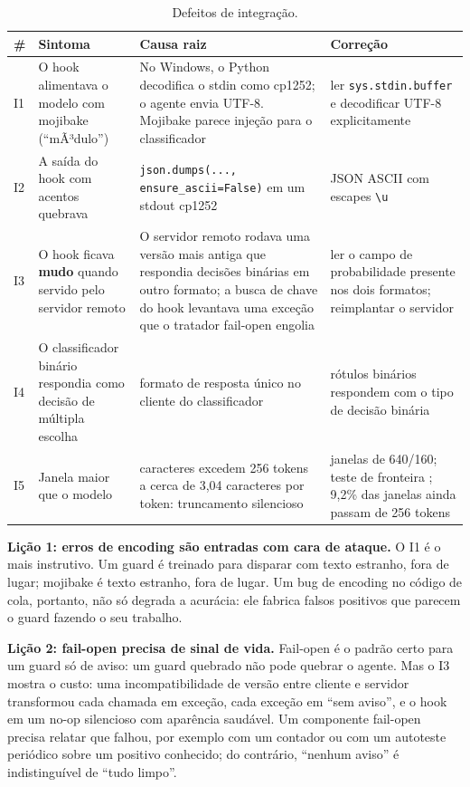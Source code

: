 \documentclass[11pt]{article}
\newcommand{\code}[1]{\texttt{#1}}
\begin{document}
\begin{table}[tbp]
\centering
\small
\caption{Defeitos de integração.}\label{tab:12}
\begin{tabularx}{\linewidth}{@{}l>{\raggedright\arraybackslash\hsize=0.60\hsize}X>{\raggedright\arraybackslash\hsize=1.50\hsize}X>{\raggedright\arraybackslash\hsize=0.90\hsize}X@{}}
\toprule
\# & Sintoma & Causa raiz & Correção \\
\midrule
I1 & O hook alimentava o modelo com mojibake (``mÃ³dulo'') & No Windows, o Python decodifica o stdin como cp1252; o agente envia UTF-8. Mojibake parece injeção para o classificador & ler \code{sys.\allowbreak{}stdin.\allowbreak{}buffer} e decodificar UTF-8 explicitamente %
 \\
I2 & A saída do hook com acentos quebrava & \code{json.\allowbreak{}dumps(.\allowbreak{}.\allowbreak{}.\allowbreak{}, ensure\_\allowbreak{}ascii=False)} em um stdout cp1252 & JSON ASCII com escapes \code{\textbackslash{}u} %
 \\
I3 & O hook ficava \textbf{mudo} quando servido pelo servidor remoto & O servidor remoto rodava uma versão mais antiga que respondia decisões binárias em outro formato; a busca de chave do hook levantava uma exceção que o tratador fail-open engolia & ler o campo de probabilidade presente nos dois formatos; reimplantar o servidor %
 \\
I4 & O classificador binário respondia como decisão de múltipla escolha & formato de resposta único no cliente do classificador & rótulos binários respondem com o tipo de decisão binária %
 \\
I5 & Janela maior que o modelo & 1.500 caracteres excedem 256 tokens a cerca de 3,04 caracteres por token: truncamento silencioso & janelas de 640/160; teste de fronteira%
; 9,2\% das janelas ainda passam de 256 tokens %
 \\
\bottomrule
\end{tabularx}
\end{table}

\textbf{Lição 1: erros de encoding são entradas com cara de ataque.} O I1 é o mais instrutivo. Um guard é treinado para disparar com texto estranho, fora de lugar; mojibake é texto estranho, fora de lugar. Um bug de encoding no código de cola, portanto, não só degrada a acurácia: ele fabrica falsos positivos que parecem o guard fazendo o seu trabalho.

\textbf{Lição 2: fail-open precisa de sinal de vida.} Fail-open é o padrão certo para um guard só de aviso: um guard quebrado não pode quebrar o agente. Mas o I3 mostra o custo: uma incompatibilidade de versão entre cliente e servidor transformou cada chamada em exceção, cada exceção em ``sem aviso'', e o hook em um no-op silencioso com aparência saudável. Um componente fail-open precisa relatar que falhou, por exemplo com um contador ou com um autoteste periódico sobre um positivo conhecido; do contrário, ``nenhum aviso'' é indistinguível de ``tudo limpo''.
\end{document}
